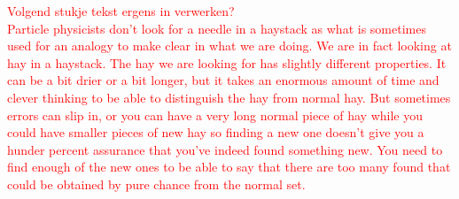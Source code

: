 \textcolor{red}{
Volgend stukje tekst ergens in verwerken?\\
\noindent Particle physicists don't look for a needle in a haystack as what is sometimes used for an analogy to make clear in what we are doing. We are in fact looking at hay in a haystack. The hay we are looking for has slightly different properties. It can be a bit drier or a bit longer, but it takes an enormous amount of time and clever thinking to be able to distinguish the hay from normal hay. But sometimes errors can slip in, or you can have a very long normal piece of hay while you could have smaller pieces of new hay so finding a new one doesn't give you a hunder percent assurance that you've indeed found something new. You need to find enough of the new ones to be able to say that there are too many found that could be obtained by pure chance from the normal set.
}